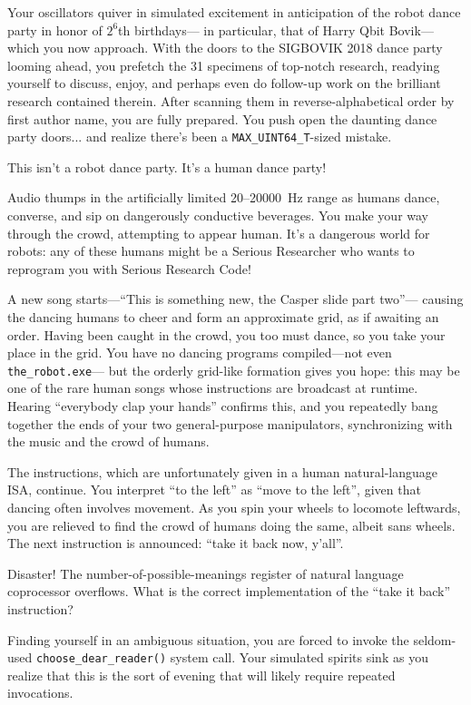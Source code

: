 Your oscillators quiver in simulated excitement in anticipation of
the robot dance party in honor of $2^6$th birthdays---%
in particular, that of Harry Qbit Bovik---%
which you now approach.
With the doors to the SIGBOVIK 2018 dance party looming ahead,
you prefetch the 31 specimens of top-notch research,
readying yourself to discuss, enjoy, and perhaps even do follow-up work on
the brilliant research contained therein.
After scanning them in reverse-alphabetical order by first author name,
you are fully prepared.
You push open the daunting dance party doors...
and realize there's been a \texttt{MAX\_UINT64\_T}-sized mistake.

This isn't a robot dance party.
It's a human dance party!

Audio thumps in the artificially limited 20--20000~Hz range
as humans dance, converse,
and sip on dangerously conductive beverages.
You make your way through the crowd, attempting to appear human.
It's a dangerous world for robots:
any of these humans might be a Serious Researcher
who wants to reprogram you with Serious Research Code!

A new song starts---``This is something new, the Casper slide part two''---%
causing the dancing humans to cheer and form an approximate grid,
as if awaiting an order.
Having been caught in the crowd, you too must dance,
so you take your place in the grid.
You have no dancing programs compiled---not even \texttt{the\_robot.exe}---%
but the orderly grid-like formation gives you hope:
this may be one of the rare human songs
whose instructions are broadcast at runtime.
Hearing ``everybody clap your hands'' confirms this,
and you repeatedly bang together the ends of
your two general-purpose manipulators,
synchronizing with the music and the crowd of humans.

The instructions,
which are unfortunately given in a human natural-language ISA, continue.
You interpret ``to the left'' as ``move to the left'',
given that dancing often involves movement.
As you spin your wheels to locomote leftwards,
you are relieved to find the crowd of humans doing the same,
albeit sans wheels.
The next instruction is announced: ``take it back now, y'all''.

Disaster!
The number-of-possible-meanings register of natural language coprocessor
overflows.
What is the correct implementation of the ``take it back'' instruction?

Finding yourself in an ambiguous situation,
you are forced to invoke
the seldom-used \texttt{choose\_dear\_reader()} system call.
Your simulated spirits sink as you realize that
this is the sort of evening that will likely require repeated invocations.

